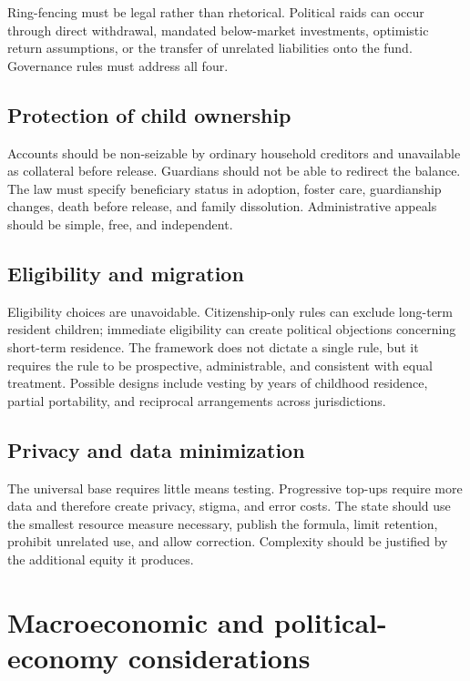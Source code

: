 \documentclass[11pt]{article}
\begin{document}
Ring-fencing must be legal rather than rhetorical. Political raids can occur through
direct withdrawal, mandated below-market investments, optimistic return assumptions,
or the transfer of unrelated liabilities onto the fund. Governance rules must address
all four.

\subsection{Protection of child ownership}

Accounts should be non-seizable by ordinary household creditors and unavailable as
collateral before release. Guardians should not be able to redirect the balance. The
law must specify beneficiary status in adoption, foster care, guardianship changes,
death before release, and family dissolution. Administrative appeals should be simple,
free, and independent.

\subsection{Eligibility and migration}

Eligibility choices are unavoidable. Citizenship-only rules can exclude long-term
resident children; immediate eligibility can create political objections concerning
short-term residence. The framework does not dictate a single rule, but it requires the
rule to be prospective, administrable, and consistent with equal treatment. Possible
designs include vesting by years of childhood residence, partial portability, and
reciprocal arrangements across jurisdictions.

\subsection{Privacy and data minimization}

The universal base requires little means testing. Progressive top-ups require more data
and therefore create privacy, stigma, and error costs. The state should use the smallest
resource measure necessary, publish the formula, limit retention, prohibit unrelated
use, and allow correction. Complexity should be justified by the additional equity it
produces.

\section{Macroeconomic and political-economy considerations}
\end{document}
